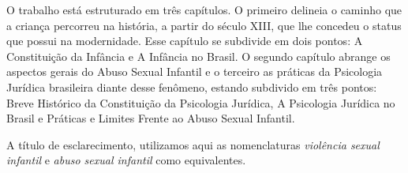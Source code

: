 O trabalho está estruturado em três capítulos. O primeiro delineia o caminho que a criança percorreu na história, a partir do século XIII, que lhe concedeu o status que possui na modernidade. Esse capítulo se subdivide em dois pontos: A Constituição da Infância e A Infância no Brasil. O segundo capítulo abrange os aspectos gerais do Abuso Sexual Infantil e o terceiro as práticas da Psicologia Jurídica brasileira diante desse fenômeno, estando subdivido em três pontos: Breve Histórico da Constituição da Psicologia Jurídica, A Psicologia Jurídica no Brasil e Práticas e Limites Frente ao Abuso Sexual Infantil.

A título de esclarecimento, utilizamos aqui as nomenclaturas \emph{violência sexual infantil} e \emph{abuso sexual infantil} como equivalentes.
